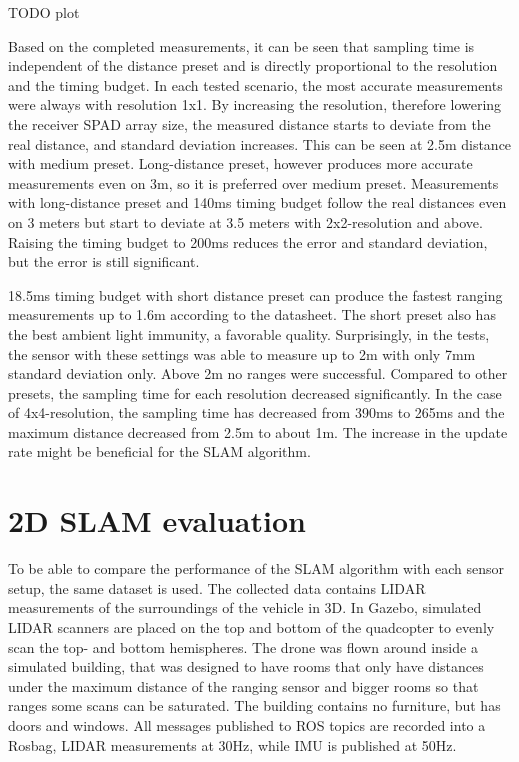 \documentclass[conference]{IEEEtran}
\begin{document}
TODO plot

Based on the completed measurements, it can be seen that sampling time is independent of the distance preset 
and is directly proportional to the resolution and the timing budget. In each tested 
scenario, the most accurate measurements were always with resolution 1x1. By increasing the resolution, therefore
lowering the receiver SPAD array size, the measured distance starts to deviate from the real distance, and 
standard deviation increases. This can be seen at 2.5m distance with medium preset. Long-distance preset, 
however produces more accurate measurements even on 3m, so it is preferred over medium preset. Measurements 
with long-distance preset and 140ms timing budget follow the real distances even on 3 meters but start to 
deviate at 3.5 meters with 2x2-resolution and above. Raising the timing budget to 200ms reduces the error 
and standard deviation, but the error is still significant.

18.5ms timing budget with short distance preset can produce the fastest ranging measurements up to 1.6m according
to the datasheet. The short preset also has the best ambient light immunity, a favorable quality. Surprisingly,
in the tests, the sensor with these settings was able to measure up to 2m with only 7mm standard deviation only. 
Above 2m no ranges were successful. Compared to other presets, the sampling time for each resolution decreased
significantly. In the case of 4x4-resolution, the sampling time has decreased from 390ms to 265ms and the 
maximum distance decreased from 2.5m to about 1m. The increase in the update rate might be beneficial for 
the SLAM algorithm. 

\section{2D SLAM evaluation}

To be able to compare the performance of the SLAM algorithm with each sensor setup, the same dataset 
is used. The collected data contains LIDAR measurements of the surroundings of the vehicle in 3D. In Gazebo, 
simulated LIDAR scanners are placed on the top and bottom of the quadcopter to evenly scan the top- and bottom 
hemispheres. The drone was flown around inside a simulated building, that was designed to have rooms that only 
have distances under the maximum distance of the ranging sensor and bigger rooms so that ranges some scans 
can be saturated. The building contains no furniture, but has doors and windows. All messages published to ROS
topics are recorded into a Rosbag, LIDAR measurements at 30Hz, while IMU is published at 50Hz.
\end{document}

